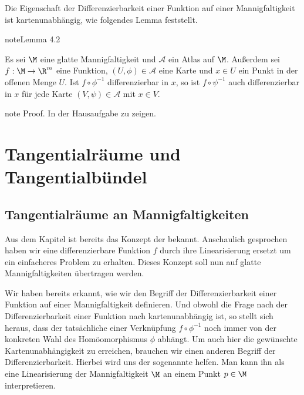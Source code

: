 \documentclass[letterpaper,10pt,english]{jupyterBook}
\begin{document}
\sphinxAtStartPar
Die Eigenschaft der Differenzierbarkeit einer Funktion auf einer Mannigfaltigkeit ist kartenunabhängig, wie folgendes Lemma feststellt.
\label{manifolds/manifolds_prelim:lem:differenzierbarkeitKartenunabhaengig}
\begin{sphinxadmonition}{note}{Lemma 4.2}



\sphinxAtStartPar
Es sei \(\M\) eine glatte Mannigfaltigkeit und \(\mathcal{A}\) ein Atlas auf \(\M\).
Außerdem sei \(f:\M \to \R^m\) eine Funktion, \((U,\phi)\in \mathcal{A}\) eine Karte und \(x \in U\) ein Punkt in der offenen Menge \(U\).
Ist \(f\circ\phi^{-1}\) differenzierbar in \(x\), so ist \(f\circ\psi^{-1}\) auch differenzierbar in \(x\) für jede Karte \((V,\psi) \in \mathcal{A}\) mit \(x\in V\).
\end{sphinxadmonition}

\begin{sphinxadmonition}{note}
\sphinxAtStartPar
Proof. In der Hausaufgabe zu zeigen.
\end{sphinxadmonition}


\section{Tangentialräume und Tangentialbündel}
\label{\detokenize{manifolds/tangential:tangentialraume-und-tangentialbundel}}\label{\detokenize{manifolds/tangential::doc}}

\subsection{Tangentialräume an Mannigfaltigkeiten}
\label{\detokenize{manifolds/tangential:tangentialraume-an-mannigfaltigkeiten}}
\sphinxAtStartPar
Aus dem Kapitel {\hyperref[\detokenize{odestability/ruhelagen:s-linearisierung-ruhelage}]{}} ist bereits das Konzept der  bekannt.
Anschaulich gesprochen haben wir eine differenzierbare Funktion \(f\) durch ihre Linearisierung ersetzt um ein einfacheres Problem zu erhalten.
Dieses Konzept soll nun auf glatte Mannigfaltigkeiten übertragen werden.

\sphinxAtStartPar
Wir haben bereits erkannt, wie wir den Begriff der Differenzierbarkeit einer Funktion auf einer Mannigfaltigkeit definieren.
Und obwohl die Frage nach der Differenzierbarkeit einer Funktion nach {\hyperref[\detokenize{manifolds/manifolds_prelim:lem:differenzierbarkeitKartenunabhaengig}]{}} kartenunabhängig ist, so stellt sich heraus, dass der tatsächliche  einer Verknüpfung \(f \circ\phi^{-1}\) noch immer von der konkreten Wahl des Homöomorphismus \(\phi\) abhängt.
Um auch hier die gewünschte Kartenunabhängigkeit zu erreichen, brauchen wir einen anderen Begriff der Differenzierbarkeit.
Hierbei wird uns der sogenannte  helfen.
Man kann ihn als eine Linearisierung der Mannigfaltigkeit \(\M\) an einem Punkt \(p\in\M\) interpretieren.
\end{document}
